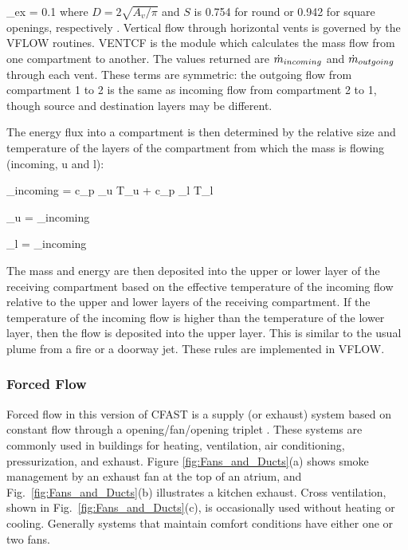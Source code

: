 \be \dm_{ex} = 0.1   \ee
where $D = 2 \sqrt{A_v / \pi}$ and $S$ is 0.754 for round or 0.942 for square openings, respectively \cite{Cooper:1989}. Vertical flow through horizontal vents is governed by the VFLOW routines. VENTCF is the module which calculates the mass flow from one compartment to another. The values returned are $\dot{m}_{incoming}$ and $\dot{m}_{outgoing}$ through each vent. These terms are symmetric: the outgoing flow from compartment 1 to 2 is the same as incoming flow from compartment 2 to 1, though source and destination layers may be different.

The energy flux into a compartment is then determined by the relative size and temperature of the layers of the compartment from which the mass is flowing (incoming, u and l):

\be \dq_{incoming} = c_p \dm_u T_u + c_p \dm_l T_l \ee

\be \dm_u = \dm_{incoming}  \ee

\be \dm_l = \dm_{incoming}  \ee


The mass and energy are then deposited into the upper or lower layer of the receiving compartment based on the effective temperature of the incoming flow relative to the upper and lower layers of the receiving compartment. If the temperature of the incoming flow is higher than the temperature of the lower layer, then the flow is deposited into the upper layer. This is similar to the usual plume from a fire or a doorway jet. These rules are implemented in VFLOW.

\subsubsection{Forced Flow}

Forced flow in this version of CFAST is a supply (or exhaust) system based on constant flow through a opening/fan/opening triplet . These systems are commonly used in buildings for heating, ventilation, air conditioning, pressurization, and exhaust. Figure \ref{fig:Fans_and_Ducts}(a) shows smoke management by an exhaust fan at the top of an atrium, and Fig.~\ref{fig:Fans_and_Ducts}(b) illustrates a kitchen exhaust.  Cross ventilation, shown in Fig.~\ref{fig:Fans_and_Ducts}(c), is occasionally used without heating or cooling.  Generally systems that maintain comfort conditions have either one or two fans.

